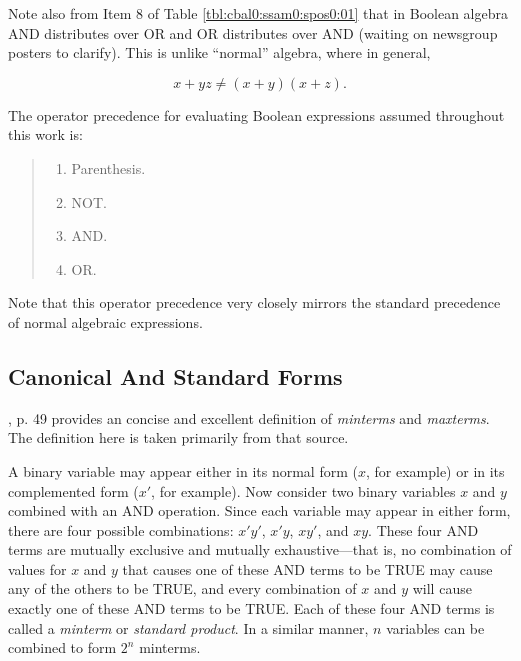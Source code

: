 Note also from Item 8 of
Table \ref{tbl:cbal0:ssam0:spos0:01} that in Boolean algebra
AND distributes over OR and OR distributes over AND (waiting on
newsgroup posters to clarify).  This is unlike ``normal'' algebra, where 
in general,

\begin{equation}
x + yz \neq (x+y) (x+z).
\end{equation}

The %
%
operator precedence for evaluating Boolean expressions assumed throughout
this work is:

\begin{quote}
\begin{enumerate}
\item Parenthesis.
\item NOT.
\item AND.
\item OR.
\end{enumerate}
\end{quote}

\noindent{}Note that this operator precedence very closely mirrors
the standard precedence of normal algebraic expressions.

\subsection{Canonical And Standard Forms}
\label{cbal0:ssam0:scas0}

\cite{bibref:b:manodigitaldesignseconded}, p. 49 provides an concise and
excellent definition of \emph{minterms} and \emph{maxterms}.  The definition
here is taken primarily from that source.

A binary variable may appear either in its normal form ($x$, for example)
or in its complemented form ($x'$, for example).  Now consider two
binary variables $x$ and $y$ combined with an AND
operation.  Since each variable may appear in either form, there are four
possible combinations:  $x'y'$, $x'y$, $xy'$, and $xy$.  These
four AND terms are mutually exclusive and mutually exhaustive---that is,
no combination of values for
$x$ and
$y$ that causes one of these AND terms to be TRUE may cause any of the
others to be TRUE, and every combination of $x$ and $y$ will cause exactly
one of these AND terms to be TRUE.  Each of these
four AND terms is called a \emph{minterm}
or \emph{standard product}.
In a similar manner, $n$ variables can be combined to form $2^n$ minterms.

